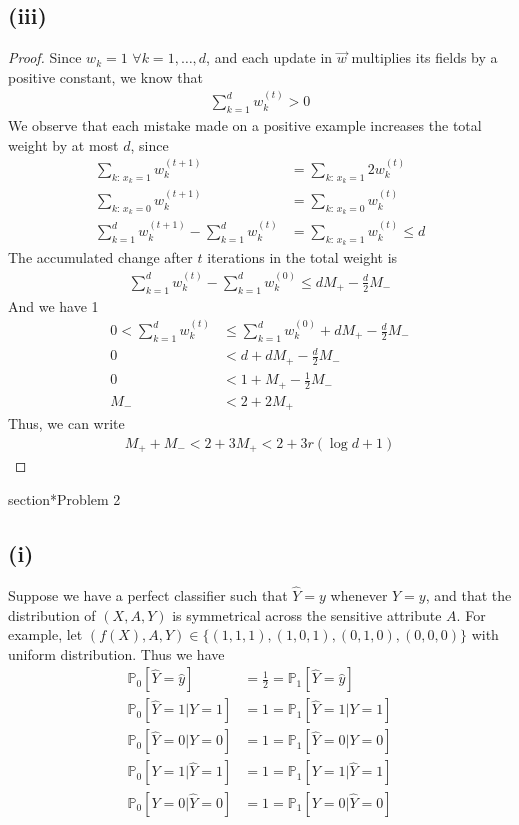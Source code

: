 \documentclass[twoside,11pt]{homework}
\begin{document}
\subsection*{(iii)}
	\begin{proof}
		Since $w_k = 1$ $\forall k = 1,\dots, d$, and each update in $\vec{w}$ multiplies its fields by a positive constant,
		we know that
		\begin{align*}
			\sum_{k=1}^d w_k ^{(t)} > 0
		\end{align*}
		We observe that each mistake made on a positive example increases the total weight by at most $d$, since
		\begin{align*}
			\sum_{k: \,x_k=1} w_k^{(t+1)}  &= \sum_{k: \,x_k=1} 2w_k^{(t)} \\
			\sum_{k: \,x_k=0} w_k^{(t+1)}  &= \sum_{k: \,x_k=0} w_k^{(t)} \\
			\sum_{k=1}^d w_k^{(t+1)}-\sum_{k=1}^d w_k^{(t)} &=   \sum_{k: \,x_k=1} w_k^{(t)} \leq d
		\end{align*}
		The accumulated change after $t$ iterations in the total weight is 
		\begin{align*}
			\sum_{k=1}^d w_k ^{(t)} -\sum_{k=1}^d w_k ^{(0)} \leq d M_+ -\frac{d}{2} M_-
		\end{align*}
		And we have 1
		\begin{align*}
			0<\sum_{k=1}^d w_k ^{(t)} &\leq  \sum_{k=1}^d w_k ^{(0)}  +d M_+ -\frac{d}{2} M_- \\
			0&<d+ d M_+ -\frac{d}{2} M_-\\
			0&<1+  M_+ -\frac{1}{2} M_-\\
			M_- &<2+  2M_+
		\end{align*}
		Thus, we can write
		\begin{align*}
			M_+ + M_-  < 2+ 3M_+< 2+3r(\log{d}+1)
		\end{align*}
	\end{proof}

section*{Problem 2}
 \subsection*{(i)}
 	Suppose we have a perfect classifier such that $\hat{Y}=y$ whenever $Y=y$,
 	and that the distribution of $(X,A,Y)$ is symmetrical across the sensitive attribute $A$.
 	For example, let $(f(X),A,Y)\in \{(1,1,1),(1,0,1),(0,1,0),(0,0,0)\}$ with uniform distribution.
 	Thus we have
 	\begin{align*}
 		\mathbb{P}_0[\hat{Y}=\hat{y}] &= \frac{1}{2} = \mathbb{P}_1 [\hat{Y}=\hat{y}] \tag{DP}  \\
 		\mathbb{P}_0[\hat{Y}=1|Y=1] &= 1 = \mathbb{P}_1 [\hat{Y}=1|Y=1] \tag{True Positive EO} \\
 		\mathbb{P}_0[\hat{Y}=0|Y=0] &= 1 = \mathbb{P}_1 [\hat{Y}=0|Y=0] \tag{True Negative EO} \\
 		\mathbb{P}_0[Y=1 | \hat{Y}=1] &=1 = \mathbb{P}_1[Y=1 | \hat{Y}=1] \tag{Positive PP} \\
 		\mathbb{P}_0[Y=0 | \hat{Y}=0] &=1 = \mathbb{P}_1[Y=0 | \hat{Y}=0] \tag{Negative PP}
 	\end{align*}
\end{document}
